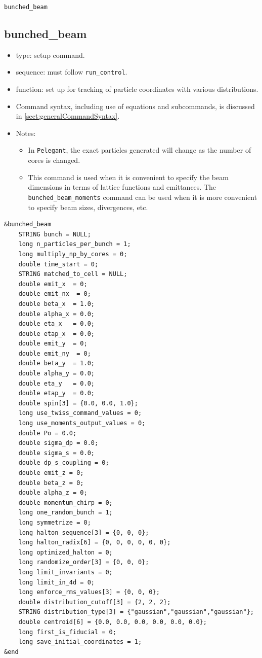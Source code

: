 \documentclass[11pt]{article}
\begin{document}
\newpage
\begin{center}{\Large\verb|bunched_beam|}\end{center}
\subsection{bunched\_beam \label{subsec:bunchedbeam}}

\begin{itemize}
\item type: setup command.
\item sequence: must follow \verb|run_control|.
\item function: set up for tracking of particle coordinates with various distributions.
\item Command syntax, including use of equations and subcommands, is discussed in \ref{sect:generalCommandSyntax}.
\item Notes:
  \begin{itemize}
  \item In \verb|Pelegant|, the exact particles generated will change as the number of cores is changed.
  \item This command is used when it is convenient to specify the beam dimensions in terms of lattice functions
    and emittances. The \verb|bunched_beam_moments| command can be used when it is more convenient to specify
    beam sizes, divergences, etc.
  \end{itemize}
\end{itemize}

\begin{verbatim}
&bunched_beam
    STRING bunch = NULL;
    long n_particles_per_bunch = 1;
    long multiply_np_by_cores = 0;
    double time_start = 0;
    STRING matched_to_cell = NULL;
    double emit_x  = 0;
    double emit_nx  = 0;
    double beta_x  = 1.0;
    double alpha_x = 0.0;
    double eta_x   = 0.0;
    double etap_x  = 0.0;
    double emit_y  = 0;
    double emit_ny  = 0;
    double beta_y  = 1.0;
    double alpha_y = 0.0;
    double eta_y   = 0.0;
    double etap_y  = 0.0;
    double spin[3] = {0.0, 0.0, 1.0};
    long use_twiss_command_values = 0;
    long use_moments_output_values = 0;
    double Po = 0.0;
    double sigma_dp = 0.0;
    double sigma_s = 0.0;
    double dp_s_coupling = 0;
    double emit_z = 0;
    double beta_z = 0;
    double alpha_z = 0;
    double momentum_chirp = 0;
    long one_random_bunch = 1;
    long symmetrize = 0;
    long halton_sequence[3] = {0, 0, 0};
    long halton_radix[6] = {0, 0, 0, 0, 0, 0};
    long optimized_halton = 0;
    long randomize_order[3] = {0, 0, 0};
    long limit_invariants = 0;
    long limit_in_4d = 0;
    long enforce_rms_values[3] = {0, 0, 0};
    double distribution_cutoff[3] = {2, 2, 2};
    STRING distribution_type[3] = {"gaussian","gaussian","gaussian"};
    double centroid[6] = {0.0, 0.0, 0.0, 0.0, 0.0, 0.0};
    long first_is_fiducial = 0;
    long save_initial_coordinates = 1;
&end
\end{verbatim}
\end{document}

